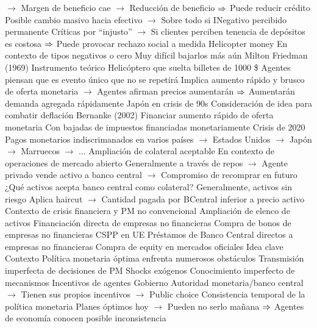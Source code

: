 \documentclass{nuevotema}
\begin{document}
\begin{esquemal}
				\4[] $\to$ Margen de beneficio cae
				\4[] $\to$ Reducción de beneficio
				\4[] $\Rightarrow$ Puede reducir crédito
				\4[] Posible cambio masivo hacia efectivo
				\4[] $\to$ Sobre todo si INegativo percibido permanente
				\4[] Críticas por ``injusto''
				\4[] $\to$ Si clientes perciben tenencia de depósitos es costosa
				\4[] $\Rightarrow$ Puede provocar rechazo social a medida
			\3 Helicopter money
				\4 En contexto de tipos negativos o cero
				\4[] Muy difícil bajarlos más aún
				\4 Milton Friedman (1969)
				\4[] Instrumento teórico
				\4[] Helicóptero que suelta billetes de 1000 \$
				\4[] Agentes piensan que es evento único que no se repetirá
				\4[] Implica aumento rápido y brusco de oferta monetaria
				\4[] $\to$ Agentes afirman precios aumentarán
				\4[] $\Rightarrow$ Aumentarán demanda agregada rápidamente
				\4 Japón en crisis de 90s
				\4[] Consideración de idea para combatir deflación
				\4 Bernanke (2002)
				\4[] Financiar aumento rápido de oferta monetaria
				\4[] Con bajadas de impuestos financiadas monetariamente
				\4 Crisis de 2020
				\4[] Pagos monetarios indiscrimanados en varios países
				\4[] $\to$ Estados Unidos
				\4[] $\to$ Japón
				\4[] $\to$ Marruecos
				\4[] $\to$ ...
			\3 Ampliación de colateral aceptable
				\4 En contexto de operaciones de mercado abierto
				\4[] Generalmente a través de repos
				\4[] $\to$ Agente privado vende activo a banco central
				\4[] $\to$ Compromiso de recomprar en futuro
				\4 ¿Qué activos acepta banco central como colateral?
				\4[] Generalmente, activos sin riesgo
				\4[] Aplica haircut
				\4[] $\to$ Cantidad pagada por BCentral inferior a precio activo
				\4 Contexto de crisis financiera y PM no convencional
				\4[] Ampliación de elenco de activos
			\3 Financiación directa de empresas no financieras
				\4 Compra de bonos de empresas no financieras
				\4[] CSPP en UE
				\4 Préstamos de Banco Central directos a empresas no financieras
				\4 Compra de equity en mercados oficiales
	\1 
		\2 Idea clave
			\3 Contexto
				\4 Política monetaria óptima enfrenta numerosos obstáculos
				\4 Transmisión imperfecta de decisiones de PM
				\4[] Shocks exógenos
				\4[] Conocimiento imperfecto de mecanismos
				\4 Incentivos de agentes
				\4[] Gobierno
				\4[] Autoridad monetaria/banco central
				\4[] $\to$ Tienen sus propios incentivos
				\4[] $\to$ Public choice
				\4 Consistencia temporal de la política monetaria
				\4[] Planes óptimos hoy
				\4[] $\to$ Pueden no serlo mañana
				\4[] $\Rightarrow$ Agentes de economía conocen posible inconsistencia

\end{esquemal}
\end{document}
